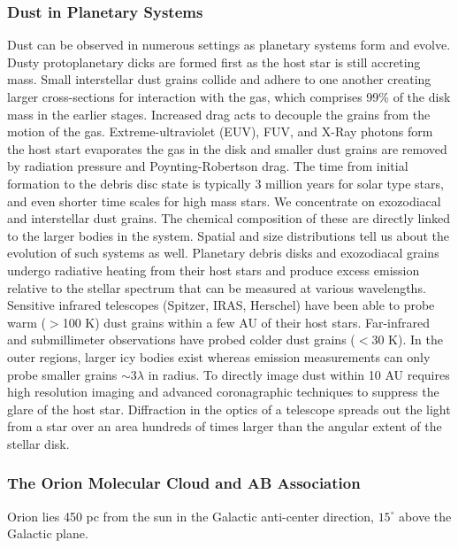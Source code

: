 \documentclass[10pt]{article}
\theoremstyle{definition}
\begin{document}
\subsubsection*{Dust in Planetary Systems}

Dust can be observed in numerous settings as planetary systems form and evolve. Dusty protoplanetary dicks are formed first as the host star is still accreting mass. Small interstellar dust grains collide and adhere to one another creating larger cross-sections for interaction with the gas, which comprises 99\% of the disk mass in the earlier stages. Increased drag acts to decouple the grains from the motion of the gas. Extreme-ultraviolet (EUV), FUV, and X-Ray photons form the host start evaporates the gas in the disk and smaller dust grains are removed by radiation pressure and Poynting-Robertson drag. The time from initial formation to the debris disc state is typically 3 million years for solar type stars, and even shorter time scales for high mass stars. We concentrate on exozodiacal and interstellar dust grains. The chemical composition of these are directly linked to the larger bodies in the system. Spatial and size distributions tell us about the evolution of such systems as well. Planetary debris disks and exozodiacal grains undergo radiative heating from their host stars and produce excess emission relative to the stellar spectrum that can be measured at various wavelengths. Sensitive infrared telescopes (Spitzer, IRAS, Herschel) have been able to probe warm ($>$100 K) dust grains within a few AU of their host stars. Far-infrared and submillimeter observations have probed colder dust grains ($<$30 K). In the outer regions, larger icy bodies exist whereas emission measurements can only probe smaller grains $\sim 3\lambda$ in radius. To directly image dust within 10 AU requires high resolution imaging and advanced coronagraphic techniques to suppress the glare of the host star. Diffraction in the optics of a telescope spreads out the light from a star over an area hundreds of times larger than the angular extent of the stellar disk. 
\subsubsection*{The Orion Molecular Cloud and AB Association}
Orion lies 450 pc from the sun in the Galactic anti-center direction, $15^{\circ}$ above the Galactic plane. 
\end{document}
